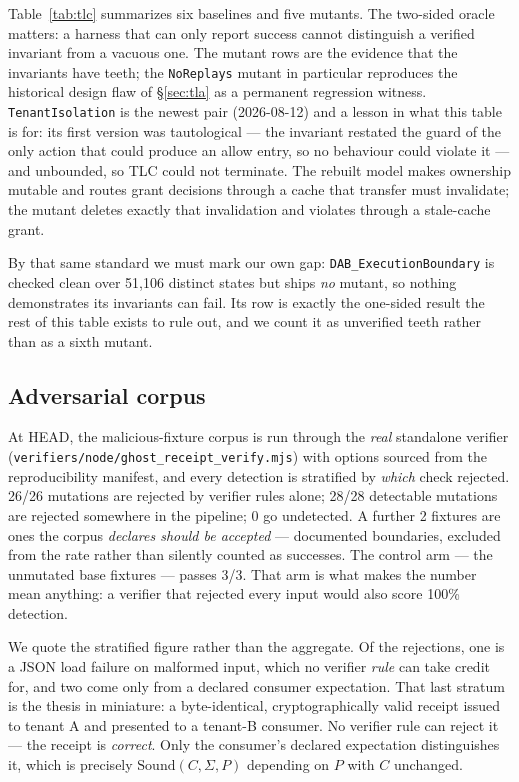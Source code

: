 \documentclass[10pt,twocolumn,letterpaper]{article}
\newcommand{\evthreeintrinsic}{26/26}   %
\newcommand{\evthreeaggregate}{28/28}   %
\newcommand{\evthreecontrol}{3/3}       %
\newcommand{\evthreeundetected}{0}
\newcommand{\evthreeboundary}{2}        %
\newcommand{\ebstates}{51{,}106}
\begin{document}
Table~\ref{tab:tlc} summarizes six baselines and five mutants. The
two-sided oracle matters: a harness that can only report success cannot
distinguish a verified invariant from a vacuous one. The mutant rows are the
evidence that the invariants have teeth; the \texttt{NoReplays} mutant in
particular reproduces the historical design flaw of \S\ref{sec:tla} as a
permanent regression witness. \texttt{TenantIsolation} is the newest pair
(2026-08-12) and a lesson in what this table is for: its first version was
tautological --- the invariant restated the guard of the only action that could
produce an allow entry, so no behaviour could violate it --- and unbounded, so
TLC could not terminate. The rebuilt model makes ownership mutable and routes
grant decisions through a cache that transfer must invalidate; the mutant
deletes exactly that invalidation and violates through a stale-cache grant.

By that same standard we must mark our own gap: \texttt{DAB\_ExecutionBoundary}
is checked clean over \ebstates{} distinct states but ships \emph{no} mutant, so
nothing demonstrates its invariants can fail. Its row is exactly the one-sided
result the rest of this table exists to rule out, and we count it as unverified
teeth rather than as a sixth mutant.

\subsection{Adversarial corpus}
\label{sec:eval-corpus}

At HEAD, the malicious-fixture corpus is run through the \emph{real}
standalone verifier (\texttt{verifiers/node/ghost\_receipt\_verify.mjs}) with
options sourced from the reproducibility manifest, and every detection is
stratified by \emph{which} check rejected. \evthreeintrinsic{} mutations are
rejected by verifier rules alone; \evthreeaggregate{} detectable mutations are
rejected somewhere in the pipeline; \evthreeundetected{} go undetected. A
further \evthreeboundary{} fixtures are ones the corpus \emph{declares should
be accepted} --- documented boundaries, excluded from the rate rather than
silently counted as successes. The control arm --- the unmutated base
fixtures --- passes \evthreecontrol{}. That arm is what makes the number mean
anything: a verifier that rejected every input would also score 100\%
detection.

We quote the stratified figure rather than the aggregate. Of the rejections,
one is a JSON load failure on malformed input, which no verifier \emph{rule}
can take credit for, and two come only from a declared consumer expectation.
That last stratum is the thesis in miniature: a byte-identical,
cryptographically valid receipt issued to tenant A and presented to a tenant-B
consumer. No verifier rule can reject it --- the receipt is \emph{correct}.
Only the consumer's declared expectation distinguishes it, which is precisely
$\mathrm{Sound}(C,\Sigma,P)$ depending on $P$ with $C$ unchanged.
\end{document}
